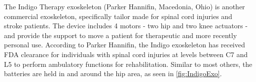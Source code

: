 The Indigo Therapy exoskeleton (Parker Hannifin, Macedonia, Ohio) is another commercial exoskeleton, specifically tailor made for spinal cord injuries and stroke patients. The device includes 4 motors - two hip and two knee actuators - and provide the support to move a patient for therapeutic and more recently personal use. According to Parker Hannifin, the Indigo exoskeleton has received FDA clearance for individuals with spinal cord injuries at levels between C7 and L5 to perform ambulatory functions for rehabilitation. Similar to most others, the batteries are held in and around the hip area, as seen in \autoref{fig:IndigoExo}.



